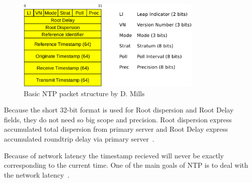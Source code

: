 
\begin{figure}
	\centering
	\includegraphics[width=9cm,keepaspectratio]{fig/ntp-packet.pdf}
	\caption{Basic NTP packet structure by D. Mills}
	\label{fig:ntp-packet}
	\bigskip
\end{figure}


Because the short 32-bit format is used for Root dispersion and Root Delay fields,
they do not need so big scope and precision.
Root dispersion express accumulated total dispersion from primary server
and Root Delay express accumulated roundtrip delay via primary server~\cite{ntp-arch}.


Because of network latency the timestamp recieved will never be exactly corresponding to
the current time.
One of the main goals of NTP is to deal with the network latency~\cite{ntp-overview}.


